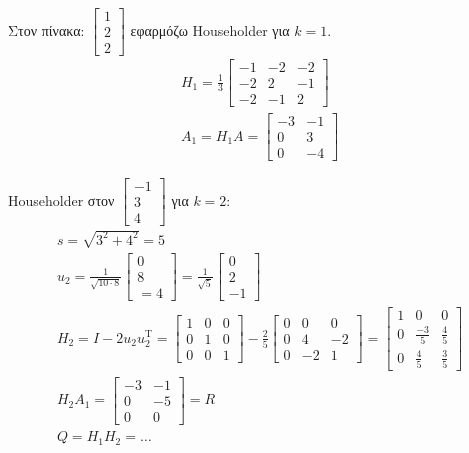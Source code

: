 \documentclass[11pt,a4paper,notitlepage,fleqn,final]{article}
\begin{document}
Στον πίνακα: \( \left[\begin{matrix}
1\\2\\2
\end{matrix}\right] \) εφαρμόζω Householder για \( k=1 \).
\begin{gather*}
	H_1 = \frac{1}{3} \left[\begin{matrix}
	-1&-2&-2\\-2&2&-1\\-2&-1&2
	\end{matrix}\right] \\
	A_1 = H_1A = \left[\begin{matrix}
	-3&-1\\0&3\\0&-4
	\end{matrix}\right]
\end{gather*}

Householder στον \( \left[\begin{matrix}
-1\\3\\4
\end{matrix}\right] \) για \( k=2 \):
\begin{gather*}
	s=\sqrt{3^2+4^2}=5 \\
	u_2 = \frac{1}{\sqrt{10\cdot 8}}\left[\begin{matrix}
	0\\8\\=4
	\end{matrix}\right] = \frac{1}{\sqrt{5}}\left[\begin{matrix}
	0\\2\\-1
	\end{matrix}\right] \\
	H_2 = I -2u_2u_2^{\mathrm T} = \left[\begin{matrix}
	1&0&0\\0&1&0\\0&0&1
	\end{matrix}\right] - \frac{2}{5}\left[\begin{matrix}
	0&0&0\\0&4&-2\\0&-2&1
	\end{matrix}\right] = \left[\begin{matrix}
	1 & 0 & 0 \\ 0 & \frac{-3}{5} & \frac{4}{5} \\
	0 & \frac{4}{5} & \frac{3}{5}
	\end{matrix}\right] \\
	H_2A_1 = \left[\begin{matrix}
	-3 & -1 \\ 0 & -5 \\ \hline 0 & 0
	\end{matrix}\right] = R \\
	Q = H_1H_2 = \dots
\end{gather*}
\end{document}
